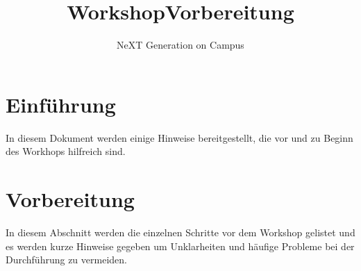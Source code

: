 \documentclass[
	ngerman,
	accentcolor=1c,%
	]{tudapub}
\begin{document}




\title{Workshop\newline Vorbereitung}
\subtitle{NeXT Generation on Campus}
\date{}





\maketitle


\newpage


\tableofcontents
\section{Einf\"uhrung}
In diesem Dokument werden einige Hinweise bereitgestellt, die vor und zu Beginn des Workhops hilfreich sind.

\section{Vorbereitung}
In diesem Abschnitt werden die einzelnen Schritte vor dem Workshop gelistet und es werden kurze Hinweise gegeben um Unklarheiten und h\"aufige Probleme bei der Durchf\"uhrung zu vermeiden.
\end{document}
